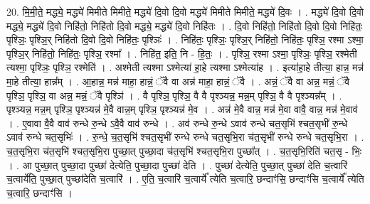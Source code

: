 \documentclass[17pt]{extarticle}
\begin{document}
20. मि॒मी॒ते॒ मद्ध्ये॒ मद्ध्ये॑ मिमीते मिमीते॒ मद्ध्ये॑ दि॒वो दि॒वो मद्ध्ये॑ मिमीते मिमीते॒ मद्ध्ये॑ दि॒वः । . मद्ध्ये॑ दि॒वो दि॒वो मद्ध्ये॒ मद्ध्ये॑ दि॒वो निहि॑तो॒ निहि॑तो दि॒वो मद्ध्ये॒ मद्ध्ये॑ दि॒वो निहि॑तः । . दि॒वो निहि॑तो॒ निहि॑तो दि॒वो दि॒वो निहि॑तः॒ पृश्ञिः॒ पृश्ञि॒र् निहि॑तो दि॒वो दि॒वो निहि॑तः॒ पृश्ञिः॑ । . निहि॑तः॒ पृश्ञिः॒ पृश्ञि॒र् निहि॑तो॒ निहि॑तः॒ पृश्ञि॒ रश्मा ऽश्मा॒ पृश्ञि॒र् निहि॑तो॒ निहि॑तः॒ पृश्ञि॒ रश्मा᳚ । . निहि॑त॒ इति॒ नि - हि॒तः॒ । . पृश्ञि॒ रश्मा ऽश्मा॒ पृश्ञिः॒ पृश्ञि॒ रश्मेती त्यश्मा॒ पृश्ञिः॒ पृश्ञि॒ रश्मेति॑ । . अश्मेती त्यश्मा ऽश्मेत्या॑ हा॒हे त्यश्मा ऽश्मेत्या॑ह । . इत्या॑हा॒हे तीत्या॒ हान्न॒ मन्न॑ मा॒हे तीत्या॒ हान्न᳚म् । . आ॒हान्न॒ मन्न॑ माहा॒ हान्नं॒ ॅवै वा अन्न॑ माहा॒ हान्नं॒ ॅवै । . अन्नं॒ ॅवै वा अन्न॒ मन्नं॒ ॅवै पृश्ञि॒ पृश्ञि॒ वा अन्न॒ मन्नं॒ ॅवै पृश्ञि॑ । . वै पृश्ञि॒ पृश्ञि॒ वै वै पृश्ञ्यन्न॒ मन्न॒म् पृश्ञि॒ वै वै पृश्ञ्यन्न᳚म् । . पृश्ञ्यन्न॒ मन्न॒म् पृश्ञि॒ पृश्ञ्यन्न॑ मे॒वै वान्न॒म् पृश्ञि॒ पृश्ञ्यन्न॑ मे॒व । . अन्न॑ मे॒वै वान्न॒ मन्न॑ मे॒वा वावै॒ वान्न॒ मन्न॑ मे॒वाव॑ । . ए॒वावा वै॒वै वाव॑ रुन्धे रु॒न्धे ऽवै॒वै वाव॑ रुन्धे । . अव॑ रुन्धे रु॒न्धे ऽवाव॑ रुन्धे चत॒सृभि॑ श्चत॒सृभी॑ रु॒न्धे ऽवाव॑ रुन्धे चत॒सृभिः॑ । . रु॒न्धे॒ च॒त॒सृभि॑ श्चत॒सृभी॑ रुन्धे रुन्धे चत॒सृभि॒रा च॑त॒सृभी॑ रुन्धे रुन्धे चत॒सृभि॒रा । . च॒त॒सृभि॒रा च॑त॒सृभि॑ श्चत॒सृभि॒रा पुच्छा॒त् पुच्छा॒दा च॑त॒सृभि॑ श्चत॒सृभि॒रा पुच्छा᳚त् । . च॒त॒सृभि॒रिति॑ चत॒सृ - भिः॒ । . आ पुच्छा॒त् पुच्छा॒दा पुच्छा॑ देत्येति॒ पुच्छा॒दा पुच्छा॑ देति । . पुच्छा॑ देत्येति॒ पुच्छा॒त् पुच्छा॑ देति च॒त्वारि॑ च॒त्वार्ये॑ति॒ पुच्छा॒त् पुच्छा॑देति च॒त्वारि॑ । . ए॒ति॒ च॒त्वारि॑ च॒त्वार्ये᳚ त्येति च॒त्वारि॒ छन्दाꣳ॑सि॒ छन्दाꣳ॑सि च॒त्वार्ये᳚ त्येति च॒त्वारि॒ छन्दाꣳ॑सि । \newline
\end{document}
